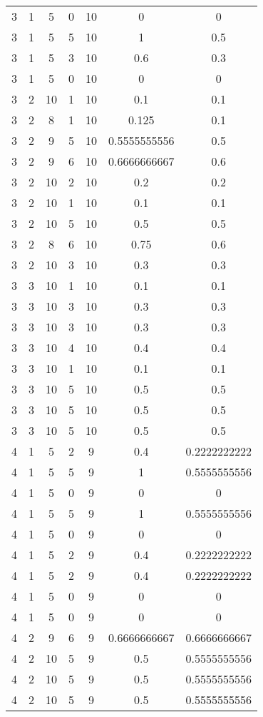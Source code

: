 \begin{longtable}[c]{| c | c | c | c | c | c | c |}
3	&	1	&	5	&	0	&	10	&	0	&	0	\\
3	&	1	&	5	&	5	&	10	&	1	&	0.5	\\
3	&	1	&	5	&	3	&	10	&	0.6	&	0.3	\\
3	&	1	&	5	&	0	&	10	&	0	&	0	\\
3	&	2	&	10	&	1	&	10	&	0.1	&	0.1	\\
3	&	2	&	8	&	1	&	10	&	0.125	&	0.1	\\
3	&	2	&	9	&	5	&	10	&	0.5555555556	&	0.5	\\
3	&	2	&	9	&	6	&	10	&	0.6666666667	&	0.6	\\
3	&	2	&	10	&	2	&	10	&	0.2	&	0.2	\\
3	&	2	&	10	&	1	&	10	&	0.1	&	0.1	\\
3	&	2	&	10	&	5	&	10	&	0.5	&	0.5	\\
3	&	2	&	8	&	6	&	10	&	0.75	&	0.6	\\
3	&	2	&	10	&	3	&	10	&	0.3	&	0.3	\\
3	&	3	&	10	&	1	&	10	&	0.1	&	0.1	\\
3	&	3	&	10	&	3	&	10	&	0.3	&	0.3	\\
3	&	3	&	10	&	3	&	10	&	0.3	&	0.3	\\
3	&	3	&	10	&	4	&	10	&	0.4	&	0.4	\\
3	&	3	&	10	&	1	&	10	&	0.1	&	0.1	\\
3	&	3	&	10	&	5	&	10	&	0.5	&	0.5	\\
3	&	3	&	10	&	5	&	10	&	0.5	&	0.5	\\
3	&	3	&	10	&	5	&	10	&	0.5	&	0.5	\\
4	&	1	&	5	&	2	&	9	&	0.4	&	0.2222222222	\\
4	&	1	&	5	&	5	&	9	&	1	&	0.5555555556	\\
4	&	1	&	5	&	0	&	9	&	0	&	0	\\
4	&	1	&	5	&	5	&	9	&	1	&	0.5555555556	\\
4	&	1	&	5	&	0	&	9	&	0	&	0	\\
4	&	1	&	5	&	2	&	9	&	0.4	&	0.2222222222	\\
4	&	1	&	5	&	2	&	9	&	0.4	&	0.2222222222	\\
4	&	1	&	5	&	0	&	9	&	0	&	0	\\
4	&	1	&	5	&	0	&	9	&	0	&	0	\\
4	&	2	&	9	&	6	&	9	&	0.6666666667	&	0.6666666667	\\
4	&	2	&	10	&	5	&	9	&	0.5	&	0.5555555556	\\
4	&	2	&	10	&	5	&	9	&	0.5	&	0.5555555556	\\
4	&	2	&	10	&	5	&	9	&	0.5	&	0.5555555556	\\

\end{longtable}
